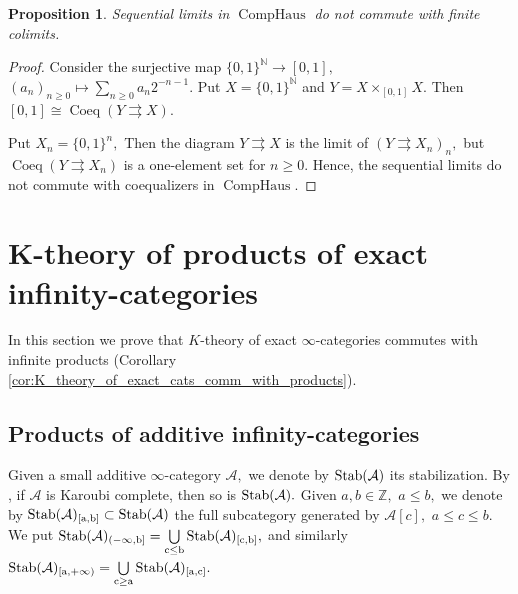 \documentclass[11pt,leqno]{amsart}
\newtheorem{prop}[theo]{Proposition}
\numberwithin{equation}{section}
\def\N{\mathbb{N}}
\def\Z{\mathbb{Z}}
\newcommand{\prodd}[1][]{\mathop{\prod}\limits_{#1}}
\newcommand{\toto}{\rightrightarrows}
\newcommand{\profin}{\operatorname{ProFin}}
\newcommand{\comphaus}{\operatorname{CompHaus}}
\newcommand{\cA}{{\mathcal A}}
\newcommand{\Coeq}{\operatorname{Coeq}}
\newcommand{\im}{\operatorname{Im}}
\newcommand{\Stab}{\rm Stab}
\newcommand{\clopen}{\operatorname{ClOpen}}
\newcommand{\Open}{\operatorname{Open}}
\begin{document}
\begin{prop}Sequential limits in $\comphaus$ do not commute with finite colimits.\end{prop}

\begin{proof}Consider the surjective map $\{0,1\}^{\N}\to [0,1],$ $(a_n)_{n\geq 0}\mapsto\sum\limits_{n\geq 0}a_n 2^{-n-1}.$ Put $X=\{0,1\}^{\N}$ and $Y=X\times_{[0,1]} X.$ Then $[0,1]\cong \Coeq(Y\toto X).$

Put $X_n=\{0,1\}^n,$ 
Then the diagram $Y\toto X$ is the limit of $(Y\toto X_n)_n,$ but $\Coeq(Y\toto X_n)$ is a one-element set for $n\geq 0.$ Hence, the sequential limits do not commute with coequalizers in $\comphaus.$\end{proof}



\section{K-theory of products of exact infinity-categories}
\label{app:K_theory_products_exact}

In this section we prove that $K$-theory of exact $\infty$-categories commutes with infinite products (Corollary \ref{cor:K_theory_of_exact_cats_comm_with_products}).

\subsection{Products of additive infinity-categories}
\label{ssec:products_of_additive_cats}

Given a small additive $\infty$-category $\cA,$ we denote by $\Stab(\cA)$ its stabilization. By \cite[Theorem 5.3.1, Proposition 6.2.1]{Bon}, if $\cA$ is Karoubi complete, then so is $\Stab(\cA).$ Given $a,b\in\Z,$ $a\leq b,$ we denote by $\Stab(\cA)_{[a,b]}\subset\Stab(\cA)$ the full subcategory generated by $\cA[c],$ $a\leq c\leq b.$ We put $\Stab(\cA)_{(-\infty,b]}=\bigcup\limits_{c\leq b}\Stab(\cA)_{[c,b]},$ and similarly $\Stab(\cA)_{[a,+\infty)}=\bigcup\limits_{c\geq a}\Stab(\cA)_{[a,c]}.$   
\end{document}
